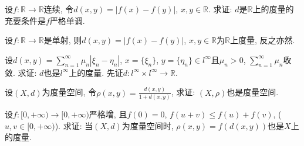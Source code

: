 \bq{}{}
设$f:\mathbb{R}\to\mathbb{R}$连续, 令$d(x,y)=|f(x)-f(y)|$, $x,y\in\mathbb{R}$. 求证: $d$是$\mathbb{R}$上的度量的充要条件是$f$严格单调.
\eq

\bq{}{}
设$f:\mathbb{R}\to\mathbb{R}$是单射, 则$d(x,y)=|f(x)-f(y)|$, $x,y\in\mathbb{R}$为$\mathbb{R}$上度量, 反之亦然.
\eq

\bq{}{}
设$d(x,y)=\sum_{n=1}^{\infty}\mu_n|\xi_n-\eta_n|$, $x=\{\xi_n\}$, $y=\{\eta_n\}\in l^{\infty}$且$\mu_n>0$, $\sum_{n=1}^{\infty}\mu_n$收敛.
求证: $d$也是$l^{\infty}$上的度量.
\eq
\ba
先证$d:l^{\infty}\times l^{\infty}\to\mathbb{R}$.
\ea

\bq{}{}
设$(X,d)$为度量空间, 令$\rho(x,y)=\frac{d(x,y)}{1+d(x,y)}$, 求证: $(X,\rho)$也是度量空间.
\eq

\bq{}{}
设$f:[0,+\infty)\to[0,+\infty)$严格增, 且$f(0)=0$, $f(u+v)\le f(u)+f(v)$, ($u,v\in[0,+\infty)$). 求证:
当$(X,d)$为度量空间时, $\rho(x,y)=f(d(x,y))$也是$X$上的度量.
\eq
